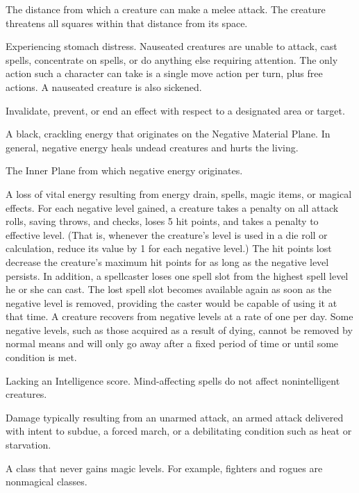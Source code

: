  The distance from which a creature can make a 
melee attack. The creature threatens all squares within that distance 
from its space. 

 Experiencing stomach distress. Nauseated creatures 
are unable to attack, cast spells, concentrate on spells, or do anything 
else requiring attention. The only action such a character can take is 
a single move action per turn, plus free actions. A nauseated creature is also sickened.

 Invalidate, prevent, or end an effect with respect to a 
designated area or target. 

 A black, crackling energy that originates on the 
Negative Material Plane. In general, negative energy heals undead 
creatures and hurts the living. 

 The Inner Plane from which negative 
energy originates. 

 A loss of vital energy resulting from energy drain, 
spells, magic items, or magical effects. For each negative level 
gained, a creature takes a  penalty on all attack rolls, saving 
throws, and checks, loses 5 hit points, and takes a 
 penalty to effective level. (That is, whenever the creature's level is 
used in a die roll or calculation, reduce its value by 1 for each 
negative level.) The hit points lost decrease the creature's maximum hit points for as long as the negative level persists. In addition, a spellcaster loses one spell slot  
from the highest spell level he or she can cast. The 
lost spell slot becomes available again as soon as the negative level is 
removed, providing the caster would be capable of using it at that 
time. A creature recovers from negative levels at a rate of one per day.
Some negative levels, such as those acquired as a result of dying, cannot be removed by normal means and will only go away after a fixed period of time or until some condition is met.

 Lacking an Intelligence score. Mind-affecting 
spells do not affect nonintelligent creatures.

 Damage typically resulting from an unarmed 
attack, an armed attack delivered with intent to subdue, a forced 
march, or a debilitating condition such as heat or starvation. 


 A class that never gains magic levels. For example, fighters and rogues are nonmagical classes.


